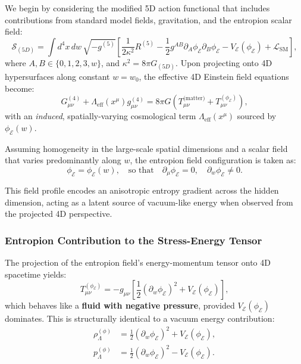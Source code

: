 \documentclass[12pt]{article}
\begin{document}
We begin by considering the modified 5D action functional that includes contributions from standard model fields, gravitation, and the entropion scalar field:
\begin{equation}
\label{eq:5d_action_cosmo}
\mathcal{S}_{(5D)} = \int d^4x \, dw \, \sqrt{-g^{(5)}} \left[ \frac{1}{2\kappa^2} R^{(5)} - \frac{1}{2} g^{AB} \partial_A \phi_{\mathcal{E}} \partial_B \phi_{\mathcal{E}} - V_{\mathcal{E}}(\phi_{\mathcal{E}}) + \mathcal{L}_{\text{SM}} \right],
\end{equation}
where \(A,B \in \{0,1,2,3,w\}\), and \(\kappa^2 = 8\pi G_{(5D)}\). Upon projecting onto 4D hypersurfaces along constant \(w = w_0\), the effective 4D Einstein field equations become:
\begin{equation}
\label{eq:4d_projected_einstein}
G_{\mu\nu}^{(4)} + \Lambda_{\text{eff}}(x^\mu) g_{\mu\nu}^{(4)} = 8\pi G \left( T_{\mu\nu}^{\text{(matter)}} + T_{\mu\nu}^{(\phi_{\mathcal{E}})} \right),
\end{equation}
with an \emph{induced}, spatially-varying cosmological term \(\Lambda_{\text{eff}}(x^\mu)\) sourced by \(\phi_{\mathcal{E}}(w)\).

Assuming homogeneity in the large-scale spatial dimensions and a scalar field that varies predominantly along \(w\), the entropion field configuration is taken as:
\begin{equation}
\label{eq:entropion_profile_improved}
\phi_{\mathcal{E}} = \phi_{\mathcal{E}}(w), \quad \text{so that} \quad \partial_\mu \phi_{\mathcal{E}} = 0, \quad \partial_w \phi_{\mathcal{E}} \neq 0.
\end{equation}

This field profile encodes an anisotropic entropy gradient across the hidden dimension, acting as a latent source of vacuum-like energy when observed from the projected 4D perspective.

\subsubsection*{Entropion Contribution to the Stress-Energy Tensor}

The projection of the entropion field’s energy-momentum tensor onto 4D spacetime yields:
\begin{equation}
\label{eq:entropion_tensor_improved}
T_{\mu\nu}^{(\phi_{\mathcal{E}})} = -g_{\mu\nu} \left[ \frac{1}{2} (\partial_w \phi_{\mathcal{E}})^2 + V_{\mathcal{E}}(\phi_{\mathcal{E}}) \right],
\end{equation}
which behaves like a \textbf{fluid with negative pressure}, provided \(V_{\mathcal{E}}(\phi_{\mathcal{E}})\) dominates. This is structurally identical to a vacuum energy contribution:
\begin{align}
\label{eq:vacuum_energy_density}
\rho_{\Lambda}^{(\phi)} &= \frac{1}{2} (\partial_w \phi_{\mathcal{E}})^2 + V_{\mathcal{E}}(\phi_{\mathcal{E}}), \\
\label{eq:vacuum_pressure}
p_{\Lambda}^{(\phi)} &= \frac{1}{2} (\partial_w \phi_{\mathcal{E}})^2 - V_{\mathcal{E}}(\phi_{\mathcal{E}}).
\end{align}
\end{document}
